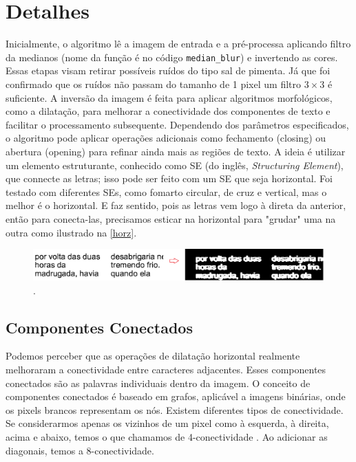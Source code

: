 \documentclass[english, 
               brazil, 
               bsc] %
               {dcomp-abntex2}
\begin{document}


\section{Detalhes} 



Inicialmente, o algoritmo lê a imagem de entrada e a pré-processa aplicando filtro da medianos (nome da função é no código \texttt{median\_blur}) e invertendo as cores. Essas etapas visam retirar possíveis ruídos do tipo sal de pimenta. Já que foi confirmado que os ruídos não passam do tamanho de 1 pixel um filtro $3 \times 3$ é suficiente. A inversão da imagem é feita para aplicar algoritmos morfológicos, como a dilatação, para melhorar a conectividade dos componentes de texto e facilitar o processamento subsequente. Dependendo dos parâmetros especificados, o algoritmo pode aplicar operações adicionais como fechamento (closing) ou abertura (opening) para refinar ainda mais as regiões de texto. A ideia é utilizar um elemento estruturante, conhecido como SE (do inglês, \textit{Structuring Element}), que connecte as letras; isso pode ser feito com um SE que seja horizontal. Foi testado com diferentes SEs, como fomarto circular, de cruz e vertical, mas o melhor é o horizontal. E faz sentido, pois as letras vem logo à direta da anterior, então para conecta-las, precisamos esticar na horizontal para "grudar" uma na outra como ilustrado na \autoref{horz}. 

\begin{figure}[htb]
        \caption{\label{horz} \small . }
        \begin{center}
            \includegraphics[scale=0.15]{./images/horizontal_5x5_aplicacao.png}
        \end{center}
\end{figure}



\subsection{Componentes Conectados}

Podemos perceber que as operações de dilatação horizontal realmente melhoraram a conectividade entre caracteres adjacentes. Esses componentes conectados são as palavras individuais dentro da imagem. O conceito de componentes conectados é baseado em grafos, aplicável a imagens binárias, onde os pixels brancos representam os nós. Existem diferentes tipos de conectividade. Se considerarmos apenas os vizinhos de um pixel como à esquerda, à direita, acima e abaixo, temos o que chamamos de 4-conectividade \cite[2.5.2 Adjacency, Connectivity, Regions, and Boundaries]{gonzalez2008digital}. Ao adicionar as diagonais, temos a 8-conectividade.
\end{document}
